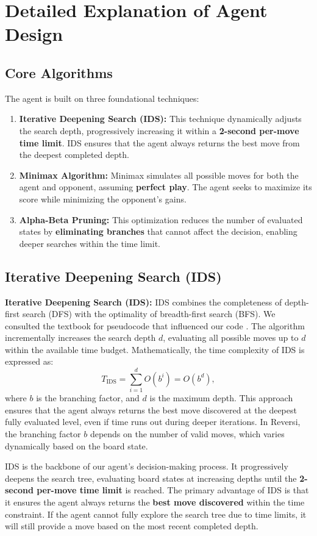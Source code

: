 \documentclass[11pt]{article}
\begin{document}
\section*{Detailed Explanation of Agent Design}

\subsection*{Core Algorithms}
The agent is built on three foundational techniques:
\begin{enumerate}
    \item \textbf{Iterative Deepening Search (IDS):} This technique dynamically adjusts the search depth, progressively increasing it within a \textbf{2-second per-move time limit}. IDS ensures that the agent always returns the best move from the deepest completed depth.
    \item \textbf{Minimax Algorithm:} Minimax simulates all possible moves for both the agent and opponent, assuming \textbf{perfect play}. The agent seeks to maximize its score while minimizing the opponent's gains.
    \item \textbf{Alpha-Beta Pruning:} This optimization reduces the number of evaluated states by \textbf{eliminating branches} that cannot affect the decision, enabling deeper searches within the time limit.
\end{enumerate}

\subsection*{Iterative Deepening Search (IDS)}
\noindent \textbf{Iterative Deepening Search (IDS):} IDS combines the completeness of depth-first search (DFS) with the optimality of breadth-first search (BFS). We consulted the textbook for pseudocode that influenced our code  \cite{ids_russell}. The algorithm incrementally increases the search depth \(d\), evaluating all possible moves up to \(d\) within the available time budget. Mathematically, the time complexity of IDS is expressed as:
\[
T_{\text{IDS}} = \sum_{i=1}^{d} O(b^i) = O(b^d),
\]
where \(b\) is the branching factor, and \(d\) is the maximum depth. This approach ensures that the agent always returns the best move discovered at the deepest fully evaluated level, even if time runs out during deeper iterations. In Reversi, the branching factor \(b\) depends on the number of valid moves, which varies dynamically based on the board state.

IDS is the backbone of our agent's decision-making process. It progressively deepens the search tree, evaluating board states at increasing depths until the \textbf{2-second per-move time limit} is reached. The primary advantage of IDS is that it ensures the agent always returns the \textbf{best move discovered} within the time constraint. If the agent cannot fully explore the search tree due to time limits, it will still provide a move based on the most recent completed depth.
\end{document}
